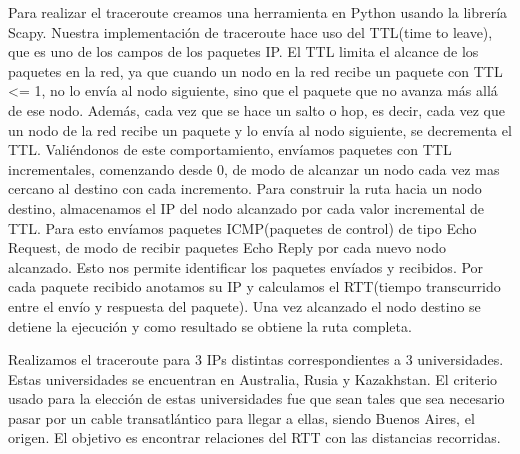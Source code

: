 Para realizar el traceroute creamos una herramienta en Python usando la librería Scapy. 
Nuestra implementación de traceroute hace uso del TTL(time to leave), que es uno de los campos de los paquetes IP. El TTL limita el alcance de los paquetes en la red, ya que cuando un nodo en la red recibe un paquete con TTL <= 1, no lo envía al nodo siguiente, sino que el paquete que no avanza más allá de ese nodo. Además, cada vez que se hace un salto o hop, es decir, cada vez que un nodo de la red recibe un paquete y lo envía al nodo siguiente, se decrementa el TTL. Valiéndonos de este comportamiento, envíamos paquetes con TTL incrementales, comenzando desde 0, de modo de alcanzar un nodo cada vez mas cercano al destino con cada incremento.
Para construir la ruta hacia un nodo destino, almacenamos el IP del nodo alcanzado por cada valor incremental de TTL. Para esto envíamos paquetes ICMP(paquetes de control) de tipo Echo Request, de modo de recibir paquetes Echo Reply por cada nuevo nodo alcanzado. Esto nos permite identificar los paquetes envíados y recibidos. Por cada paquete recibido anotamos su IP y calculamos el RTT(tiempo transcurrido entre el envío y respuesta del paquete).
Una vez alcanzado el nodo destino se detiene la ejecución y como resultado se obtiene la ruta completa.

Realizamos el traceroute para 3 IPs distintas correspondientes a 3 universidades. Estas universidades se encuentran en Australia, Rusia y Kazakhstan. El criterio usado para la elección de estas universidades fue que sean tales que sea necesario pasar por un cable transatlántico para llegar a ellas, siendo Buenos Aires, el origen. El objetivo es encontrar relaciones del RTT con las distancias recorridas.